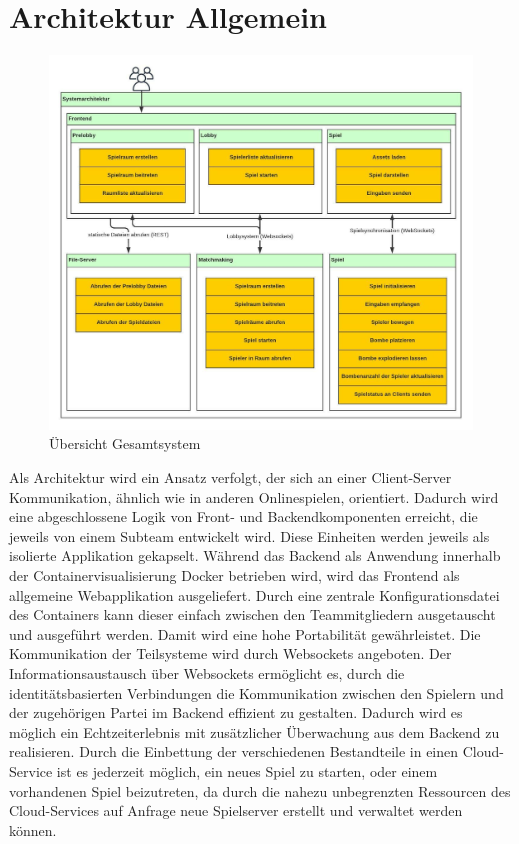 \documentclass[conference]{IEEEtran}
\begin{document}
\section{Architektur Allgemein}
\begin{figure}
    \centering
    \includegraphics[width=\textwidth]{architecture.jpeg}
    \caption{Übersicht Gesamtsystem}
\end{figure}
Als Architektur wird ein Ansatz verfolgt, der sich an einer Client-Server Kommunikation, ähnlich wie in anderen Onlinespielen, orientiert.
Dadurch wird eine abgeschlossene Logik von Front- und Backendkomponenten erreicht, die jeweils
von einem Subteam entwickelt wird. Diese Einheiten werden jeweils als isolierte Applikation gekapselt. Während das Backend als Anwendung innerhalb der Containervisualisierung Docker betrieben wird, wird das Frontend als allgemeine Webapplikation ausgeliefert. Durch eine zentrale Konfigurationsdatei des Containers kann dieser einfach zwischen den Teammitgliedern ausgetauscht und ausgeführt werden. Damit wird eine hohe Portabilität gewährleistet.
Die Kommunikation der Teilsysteme wird durch Websockets angeboten. Der Informationsaustausch über Websockets ermöglicht es, durch die identitätsbasierten Verbindungen die Kommunikation zwischen den Spielern und der zugehörigen Partei im Backend effizient zu gestalten.
Dadurch wird es möglich ein Echtzeiterlebnis mit zusätzlicher Überwachung aus dem Backend zu realisieren.
Durch die Einbettung der verschiedenen Bestandteile in einen Cloud-Service ist es jederzeit möglich, ein neues Spiel zu starten, oder einem vorhandenen Spiel beizutreten, da durch die nahezu unbegrenzten Ressourcen des Cloud-Services auf Anfrage neue Spielserver erstellt und verwaltet werden können.
\end{document}
